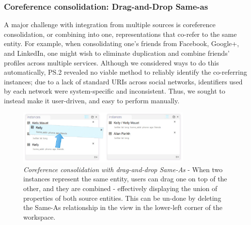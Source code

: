 \documentclass{sigchi}
\begin{document}
%
%
%
\subsubsection{Coreference consolidation: Drag-and-Drop Same-as}
A major challenge with integration from multiple sources is coreference consolidation, or combining into one, representations that co-refer to the same entity.  For example, when consolidating one's friends from Facebook, Google+, and LinkedIn, one might wish to eliminate duplication and combine friends' profiles across multiple services.  Although we considered ways to do this automatically, PS.2 revealed no viable method to reliably identify the co-referring instances; due to a lack of standard URIs across social networks, identifiers used by each network were system-specific and inconsistent. Thus, we sought to instead make it user-driven, and easy to perform manually.  

\begin{figure}[htbp]
\begin{center}
\includegraphics[width=8.7cm]{img/sameas}
\caption{\emph{Coreference consolidation with drag-and-drop Same-As} - When two instances represent the same entity, users can drag one on top of the other, and they are combined - effectively displaying the union of properties of both source entities. This can be un-done by deleting the Same-As relationship in the view in the lower-left corner of the workspace.}
\label{fig:sameas}
\end{center}
\end{figure}
\end{document}
